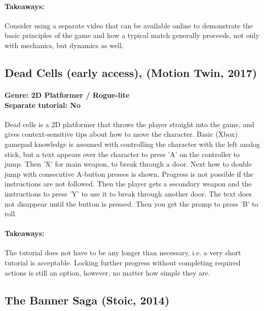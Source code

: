 \paragraph{Takeaways:}
Consider using a separate video that can be available online to demonstrate the basic principles of the game and how a typical match generally proceeds, not only with mechanics, but dynamics as well.

\subsection{Dead Cells (early access), (Motion Twin, 2017)}
\paragraph{Genre: 2D Platformer / Rogue-lite \\ Separate tutorial: No \\}
Dead cells is a 2D platformer that throws the player straight into the game, and gives context-sensitive tips about how to move the character. Basic (Xbox) gamepad knowledge is assumed with controlling the character with the left analog stick, but a text appears over the character to press 'A' on the controller to jump. Then 'X' for main weapon, to break through a door. Next how to double jump with consecutive A-button presses is shown. Progress is not possible if the instructions are not followed. Then the player gets a secondary weapon and the instructions to press 'Y' to use it to break through another door. The text does not disappear until the button is pressed. Then you get the promp to press 'B' to roll.
\paragraph{Takeaways:}
The tutorial does not have to be any longer than necessary, i.e. a very short tutorial is acceptable. Locking further progress without completing required actions is still an option, however, no matter how simple they are.

\subsection{The Banner Saga (Stoic, 2014)}

